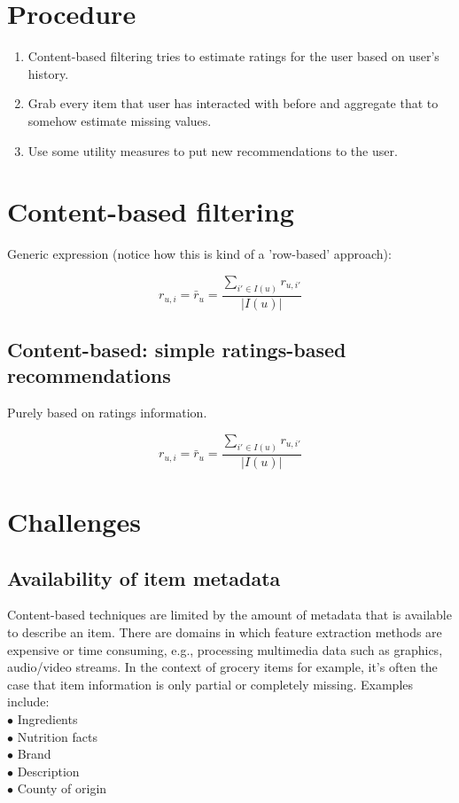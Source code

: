 \documentclass[a4 paper,11pt]{report}
\begin{document}
\section {Procedure}
\begin{enumerate}
\item Content-based filtering tries to estimate ratings for the user based on user's history. 
\item Grab every item that user has interacted with before and aggregate that to somehow estimate missing values. 
\item Use some utility measures to put new recommendations to the user.
\end{enumerate}

\section {Content-based filtering}
Generic expression (notice how this is kind of a 'row-based' approach):\cite{rec}

\begin{center}
$$ r_{u,i} = \bar r_u = \frac{\sum_{i' \in I(u)} r_{u,i'}}{|I(u)|} $$
\end{center}

\subsection {Content-based: simple ratings-based recommendations}

Purely based on ratings information.

\begin{center}
$$ r_{u,i} = \bar r_u = \frac{\sum_{i' \in I(u)} r_{u,i'}}{|I(u)|} $$
\end{center}

\newpage
\section {Challenges}

\subsection {Availability of item metadata}

Content-based techniques are limited by the amount of metadata that is available
to describe an item. There are domains in which feature extraction methods are
expensive or time consuming, e.g., processing multimedia data such as graphics,
audio/video streams. In the context of grocery items for example, it's often the
case that item information is only partial or completely missing. Examples
include:\\[10pt]
$\bullet$ Ingredients\\
$\bullet$ Nutrition facts\\
$\bullet$ Brand\\
$\bullet$ Description\\
$\bullet$ County of origin\\
\end{document}
